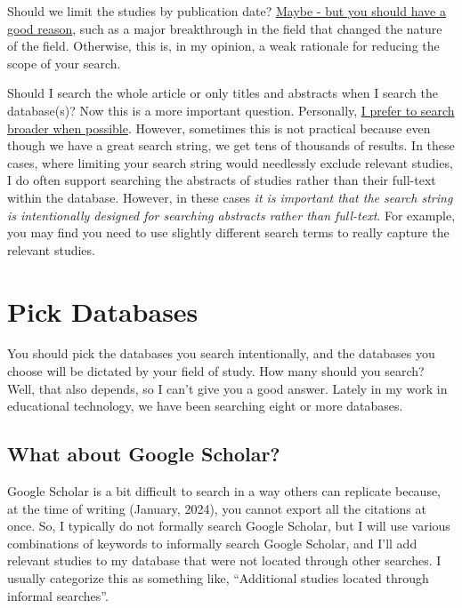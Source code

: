 \documentclass[
]{book}
\begin{document}
Should we limit the studies by publication date? \ul{Maybe - but you should have a good reason}, such as a major breakthrough in the field that changed the nature of the field. Otherwise, this is, in my opinion, a weak rationale for reducing the scope of your search.

Should I search the whole article or only titles and abstracts when I search the database(s)? Now this is a more important question. Personally, \ul{I prefer to search broader when possible}. However, sometimes this is not practical because even though we have a great search string, we get tens of thousands of results. In these cases, where limiting your search string would needlessly exclude relevant studies, I do often support searching the abstracts of studies rather than their full-text within the database. However, in these cases \emph{it is important that the search string is intentionally designed for searching abstracts rather than full-text}. For example, you may find you need to use slightly different search terms to really capture the relevant studies.

\hypertarget{pick-databases}{%
\section{Pick Databases}\label{pick-databases}}

You should pick the databases you search intentionally, and the databases you choose will be dictated by your field of study. How many should you search? Well, that also depends, so I can't give you a good answer. Lately in my work in educational technology, we have been searching eight or more databases.

\hypertarget{what-about-google-scholar}{%
\subsection{What about Google Scholar?}\label{what-about-google-scholar}}

Google Scholar is a bit difficult to search in a way others can replicate because, at the time of writing (January, 2024), you cannot export all the citations at once. So, I typically do not formally search Google Scholar, but I will use various combinations of keywords to informally search Google Scholar, and I'll add relevant studies to my database that were not located through other searches. I usually categorize this as something like, ``Additional studies located through informal searches''.
\end{document}
